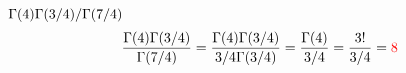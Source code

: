 \item [7.] $\Gamma(4)\Gamma(3/4)/\Gamma(7/4)$
\[
\frac{\Gamma(4)\Gamma(3/4)}{\Gamma(7/4)}=\frac{\Gamma(4)\Gamma(3/4)}{3/4\Gamma(3/4)}=\frac{\Gamma(4)}{3/4}=\frac{3!}{3/4}=\textcolor{red}{8}
\]